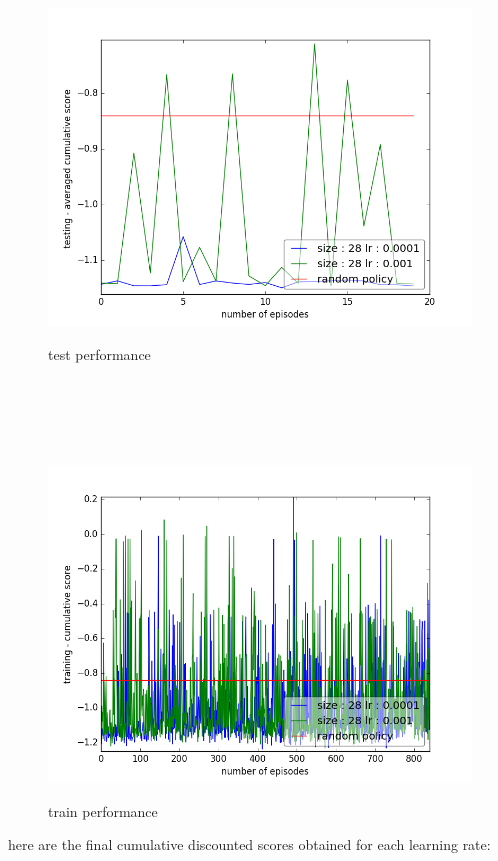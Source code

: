 \documentclass{report}
\begin{document}
\begin{figure}[H]
\begin{minipage}[c]{.49\linewidth}
	\centering
	\includegraphics[width = \linewidth]{plots/b3/Pong-v3/testScoreMean.png}
	\caption{test performance}
    \end{minipage}
    \hfill%
\begin{minipage}[c]{.49\linewidth}
    \centering 
    \includegraphics[width = \linewidth]{plots/b3/Pong-v3/trainScore.png}
	\caption{train performance}
\end{minipage}
\end{figure}


here are the final cumulative discounted scores obtained for each learning rate: \\
\end{document}

